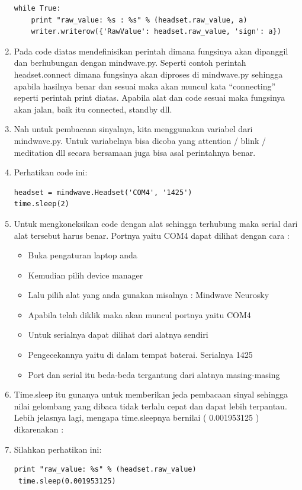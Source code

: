 \begin{enumerate}
\begin{verbatim}
while True:
    print "raw_value: %s : %s" % (headset.raw_value, a)
    writer.writerow({'RawValue': headset.raw_value, 'sign': a})
\end{verbatim}
\item Pada code diatas mendefinisikan perintah dimana fungsinya akan dipanggil dan berhubungan dengan mindwave.py. Seperti contoh perintah headset.connect dimana fungsinya akan diproses di mindwave.py sehingga apabila hasilnya benar dan sesuai maka akan muncul kata “connecting” seperti perintah print diatas. Apabila alat dan code sesuai maka fungsinya akan jalan, baik itu connected, standby dll. 
\item Nah untuk pembacaan sinyalnya, kita menggunakan variabel dari mindwave.py. Untuk variabelnya bisa dicoba yang attention / blink / meditation dll secara bersamaan juga bisa asal perintahnya benar.
\item Perhatikan code ini:
\begin{verbatim}
headset = mindwave.Headset('COM4', '1425')
time.sleep(2)
\end{verbatim}
\item Untuk mengkoneksikan code dengan alat sehingga terhubung maka serial dari alat tersebut harus benar. Portnya yaitu COM4 dapat dilihat dengan cara :
\begin{itemize}
\item Buka pengaturan laptop anda
\item Kemudian pilih device manager
\item Lalu pilih alat yang anda gunakan misalnya : Mindwave Neurosky
\item Apabila telah diklik maka akan muncul portnya yaitu COM4 
\item Untuk serialnya dapat dilihat dari alatnya sendiri 
\item Pengecekannya yaitu di dalam tempat baterai. Serialnya 1425
\item Port dan serial itu beda-beda tergantung dari alatnya masing-masing
\end{itemize}
\item Time.sleep itu gunanya untuk memberikan jeda pembacaan sinyal sehingga nilai gelombang yang dibaca tidak terlalu cepat dan dapat lebih terpantau. Lebih jelasnya lagi, mengapa time.sleepnya bernilai ( 0.001953125 ) dikarenakan :
\item Silahkan perhatikan ini:
\begin{verbatim}
print "raw_value: %s" % (headset.raw_value)
 time.sleep(0.001953125)
\end{verbatim} 

\end{enumerate}
